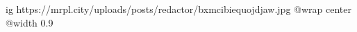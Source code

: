  
 
 
 
 

\ifcmt
  ig https://mrpl.city/uploads/posts/redactor/bxmcibiequojdjaw.jpg
  @wrap center
  @width 0.9
\fi
